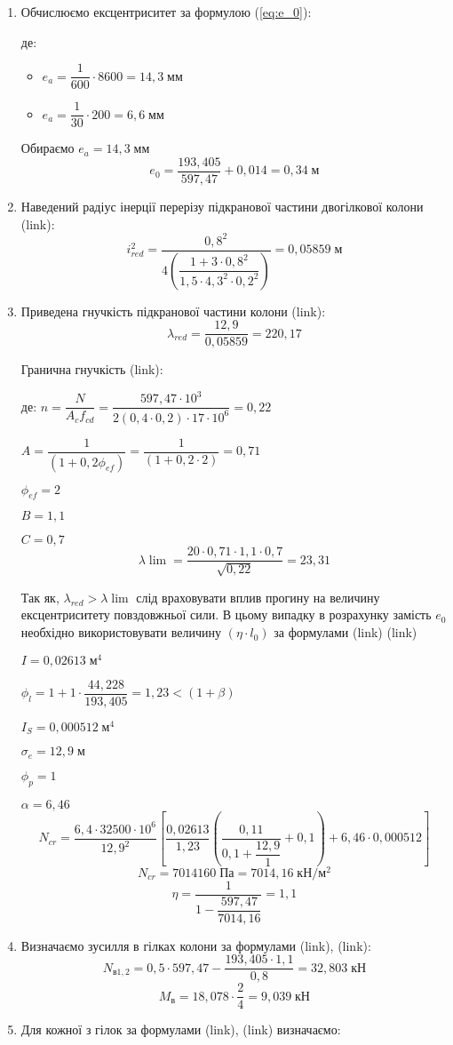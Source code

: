 \documentclass[a4paper,14pt]{article}
\begin{document}
\begin{enumerate}
    \item Обчислюємо ексцентриситет за формулою (\ref{eq:e_0}):
        
        де: \begin{itemize}
                \item $e_a = \dfrac{1}{600} \cdot 8600 = 14,3\;\textit{мм}$
                \item $e_a = \dfrac{1}{30} \cdot 200 = 6,6\;\textit{мм}$
            \end{itemize}
        Обираємо $e_a = 14,3\;\textit{мм}$
        $$e_0 = \dfrac{193,405}{597,47}+0,014 = 0,34\;\textit{м}$$
    \item Наведений радіус інерції перерізу підкранової частини двогілкової колони (link):  
        $$i_{red}^2 = \dfrac{0,8^2}{4 \left(\dfrac{1+3 \cdot 0,8^2}{1,5 \cdot 4,3^2 \cdot 0,2^2} \right)} = 0,05859\;\textit{м}$$
    \item Приведена гнучкість підкранової частини колони (link):
        $$\lambda_{red} = \dfrac{12,9}{0,05859} = 220,17$$
        
        Гранична гнучкість (link):

        де: $n = \dfrac{N}{A_cf_{cd}} = \dfrac{597,47 \cdot 10^3}{2(0,4 \cdot 0,2) \cdot 17 \cdot 10^6} = 0,22$

            $A = \dfrac{1}{(1+0,2\phi_{ef})} = \dfrac{1}{(1+0,2 \cdot 2)} = 0,71$

            $\phi_{ef} = 2$

            $B = 1,1$

            $C = 0,7$
            $$\lambda\lim = \dfrac{20 \cdot 0,71 \cdot 1,1 \cdot 0,7}{\sqrt{0,22}} = 23,31$$

        Так як, $\lambda_{red} > \lambda\lim$ слід враховувати вплив прогину на величину ексцентриситету повздовжньої сили. В цьому випадку в розрахунку замість $e_0$ необхідно використовувати
        величину $(\eta \cdot l_0)$ за формулами (link) (link)
        
        $I = 0,02613\;\textit{м}^4$

        $\phi_l = 1 + 1 \cdot \dfrac{44,228}{193,405} = 1,23 < (1 + \beta)$

        $I_S = 0,000512\;\textit{м}^4$

        $\sigma_e = 12,9\;\textit{м}$

        $\phi_p = 1$

        $\alpha = 6,46$
        $$N_{cr} = \dfrac{6,4 \cdot 32500 \cdot 10^6}{12,9^2}\left[\dfrac{0,02613}{1,23}\left(\dfrac{0,11}{0,1 + \dfrac{12,9}{1}} + 0,1\right) + 6,46 \cdot 0,000512\right]$$
        $$N_{cr} = 7014160\;\textit{Па} = 7014,16\;\textit{кН}/\textit{м}^2$$
        $$\eta = \dfrac{1}{1 - \dfrac{597,47}{7014,16}} = 1,1$$
    \item Визначаємо зусилля в гілках колони за формулами (link), (link):
        $$N_{\textit{в}1,2} = 0,5 \cdot 597,47 - \dfrac{193,405 \cdot 1,1}{0,8} = 32,803\;\textit{кН}$$
        $$M_\textit{в} = 18,078 \cdot \dfrac{2}{4} = 9,039\;\textit{кН}$$
    \item Для кожної з гілок за формулами (link), (link) визначаємо:


\end{enumerate}
\end{document}

